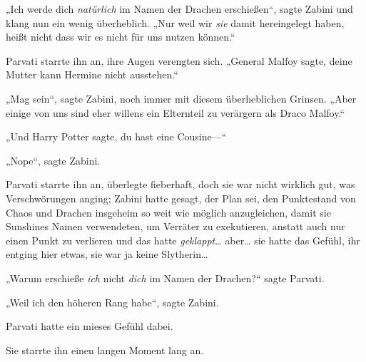 „Ich werde dich \emph{natürlich} im Namen der Drachen erschießen“, sagte Zabini und klang nun ein wenig überheblich. „Nur weil wir \emph{sie} damit hereingelegt haben, heißt nicht dass wir es nicht für uns nutzen können.“

Parvati starrte ihn an, ihre Augen verengten sich. „General Malfoy sagte, deine Mutter kann Hermine nicht ausstehen.“

„Mag sein“, sagte Zabini, noch immer mit diesem überheblichen Grinsen. „Aber einige von uns sind eher willens ein Elternteil zu verärgern als Draco Malfoy.“

„Und Harry Potter sagte, du hast eine Cousine—“

„Nope“, sagte Zabini.

Parvati starrte ihn an, überlegte fieberhaft, doch sie war nicht wirklich gut, was Verschwörungen anging; Zabini hatte gesagt, der Plan sei, den Punktestand von Chaos und Drachen insgeheim so weit wie möglich anzugleichen, damit sie Sunshines Namen verwendeten, um Verräter zu exekutieren, anstatt auch nur einen Punkt zu verlieren und das hatte \emph{geklappt}… aber… sie hatte das Gefühl, ihr entging hier etwas, sie war ja keine Slytherin…

„Warum erschieße \emph{ich} nicht \emph{dich} im Namen der Drachen?“ sagte Parvati.

„Weil ich den höheren Rang habe“, sagte Zabini.

Parvati hatte ein mieses Gefühl dabei.

Sie starrte ihn einen langen Moment lang an.

